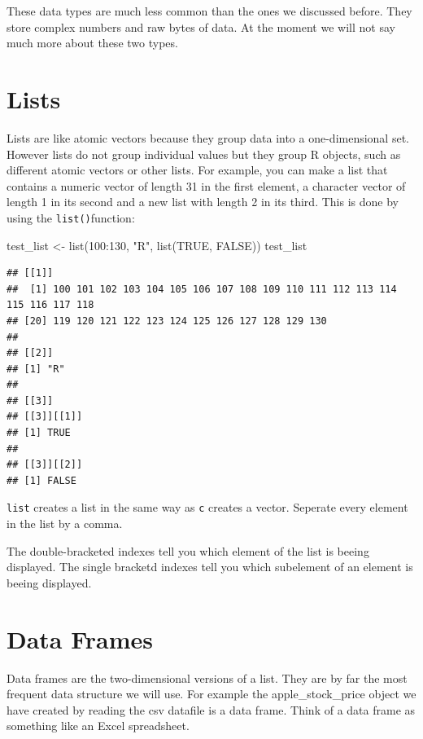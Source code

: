 \documentclass[
]{book}
\newenvironment{Shaded}{\begin{snugshade}}{\end{snugshade}}
\newcommand{\ConstantTok}[1]{\textcolor[rgb]{0.00,0.00,0.00}{#1}}
\newcommand{\DecValTok}[1]{\textcolor[rgb]{0.00,0.00,0.81}{#1}}
\newcommand{\FunctionTok}[1]{\textcolor[rgb]{0.00,0.00,0.00}{#1}}
\newcommand{\NormalTok}[1]{#1}
\newcommand{\OtherTok}[1]{\textcolor[rgb]{0.56,0.35,0.01}{#1}}
\newcommand{\SpecialCharTok}[1]{\textcolor[rgb]{0.00,0.00,0.00}{#1}}
\newcommand{\StringTok}[1]{\textcolor[rgb]{0.31,0.60,0.02}{#1}}
\begin{document}
These data types are much less common than the ones we discussed before. They
store complex numbers and raw bytes of data. At the moment we will not say much more
about these two types.

\hypertarget{lists}{%
\section{Lists}\label{lists}}

Lists are like atomic vectors because they group data into a one-dimensional set. However
lists do not group individual values but they group R objects, such as different
atomic vectors or other lists. For example, you can make a list that contains
a numeric vector of length 31 in the first element, a character vector of length 1 in its second
and a new list with length 2 in its third. This is done by using the \texttt{list()}function:

\begin{Shaded}
\begin{Highlighting}[]
\NormalTok{test\_list }\OtherTok{\textless{}{-}} \FunctionTok{list}\NormalTok{(}\DecValTok{100}\SpecialCharTok{:}\DecValTok{130}\NormalTok{, }\StringTok{"R"}\NormalTok{, }\FunctionTok{list}\NormalTok{(}\ConstantTok{TRUE}\NormalTok{, }\ConstantTok{FALSE}\NormalTok{))}
\NormalTok{test\_list}
\end{Highlighting}
\end{Shaded}

\begin{verbatim}
## [[1]]
##  [1] 100 101 102 103 104 105 106 107 108 109 110 111 112 113 114 115 116 117 118
## [20] 119 120 121 122 123 124 125 126 127 128 129 130
## 
## [[2]]
## [1] "R"
## 
## [[3]]
## [[3]][[1]]
## [1] TRUE
## 
## [[3]][[2]]
## [1] FALSE
\end{verbatim}

\texttt{list} creates a list in the same way as \texttt{c} creates a vector. Seperate every element in the
list by a comma.

The double-bracketed indexes tell you which element of the list is beeing displayed. The single
bracketd indexes tell you which subelement of an element is beeing displayed.

\hypertarget{data-frames}{%
\section{Data Frames}\label{data-frames}}

Data frames are the two-dimensional versions of a list. They are by far the most
frequent data structure we will use. For example the apple\_stock\_price object
we have created by reading the csv datafile is a data frame. Think of a data frame
as something like an Excel spreadsheet.
\end{document}
